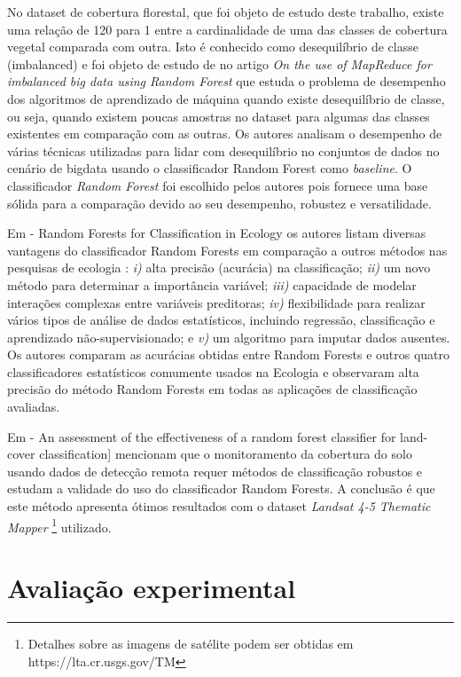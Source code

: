 \documentclass[12pt]{article}
\begin{document}
No dataset de cobertura florestal, que foi objeto de estudo deste trabalho, existe uma relação de 120 para 1 entre a cardinalidade de uma das classes de cobertura vegetal comparada com outra. Isto é conhecido como desequilíbrio de classe (imbalanced) e foi objeto de estudo de \cite{del2014use} no artigo \emph{On the use of MapReduce for imbalanced big data using Random Forest} que estuda o problema de desempenho dos algoritmos de aprendizado de máquina quando existe desequilíbrio de classe, ou seja, quando existem poucas amostras no dataset para algumas das classes existentes em comparação com as outras. Os autores analisam o desempenho de várias técnicas utilizadas para lidar com desequilíbrio no conjuntos de dados no cenário de bigdata usando o classificador Random Forest como \emph{baseline}. O classificador \emph{Random Forest} foi escolhido pelos autores pois fornece uma base sólida para a comparação devido ao seu desempenho, robustez e versatilidade.

Em \cite{cutler2007random}  - Random Forests for Classification in Ecology  os autores listam diversas vantagens do classificador Random Forests em comparação a outros métodos nas pesquisas de ecologia : \emph{i)} alta precisão (acurácia) na classificação; \emph{ii)} um novo método para determinar a importância variável; \emph{iii)} capacidade de modelar interações complexas entre variáveis preditoras; \emph{iv)} flexibilidade para realizar vários tipos de análise de dados estatísticos, incluindo regressão, classificação e aprendizado não-supervisionado; e \emph{v)} um algoritmo para imputar dados ausentes. Os autores comparam as acurácias obtidas entre Random Forests e outros quatro classificadores estatísticos comumente usados na Ecologia e observaram alta precisão do método Random Forests em todas as aplicações de classificação avaliadas.

Em \cite{rodriguez2012assessment} - An assessment of the effectiveness of a random forest classifier for land-cover classification] mencionam que o monitoramento da cobertura do solo usando dados de detecção remota requer métodos de classificação robustos e estudam a validade do uso do classificador Random Forests. A conclusão é que este método apresenta ótimos resultados com o dataset \emph{Landsat 4-5 Thematic Mapper} \footnote{Detalhes sobre as imagens de satélite podem ser obtidas em https://lta.cr.usgs.gov/TM} utilizado. 

\section{Avaliação experimental}
\label{sec:Avaliação experimental}
\end{document}
